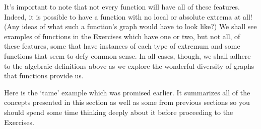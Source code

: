 
\medskip

It's important to note that not every function will have all of these features.  Indeed, it is possible to have a function with no local or absolute extrema at all!  (Any ideas of what such a function's graph would have to look like?)  We shall see examples of functions in the Exercises which have one or two, but not all, of these features, some that have instances of each type of extremum and some functions that seem to defy common sense.  In all cases, though, we shall adhere to the algebraic definitions above as we explore the wonderful diversity of graphs that functions provide us.

\medskip

Here is the `tame' example which was promised earlier.  It summarizes all of the concepts presented in this section as well as some from previous sections so you should spend some time thinking deeply about it before proceeding to the Exercises.

